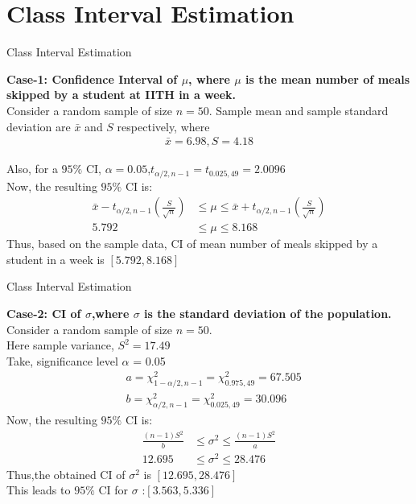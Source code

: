 \documentclass{beamer}
\begin{document}
\section{Class Interval Estimation}
\begin{frame}{Class Interval Estimation}
    \begin{block}{}
        \item \textbf{Case-1: Confidence Interval of $\mu$, where $\mu$ is the mean number of meals skipped by a student at IITH in a week. } \\
       Consider a random sample of size $n = 50$. 
       Sample mean and sample standard deviation are $\bar{x}$ and $S$ respectively, where
        \begin{align*}
            \bar{x}= 6.98, 
            S = 4.18 
        \end{align*}       
      
Also, for a $95\%$ CI, $\alpha=0.05$,$t_{\alpha/2,n-1} =t_{0.025,49}=2.0096$ \\
Now, the resulting $95\%$ CI is:
      \begin{align*}
        \bar{x}-t_{\alpha/2,n-1}\left(\frac{S}{\sqrt{n}}\right) &\leq \mu \leq \bar{x}+t_{\alpha/2,n-1}\left(\frac{S}{\sqrt{n}}\right)\\
        5.792 &\leq \mu \leq 8.168
      \end{align*}
      Thus, based on the sample data, CI of mean number of meals skipped by a student in a week is $[5.792,8.168]$ 
      \end{block}
\end{frame}
\begin{frame}{Class Interval Estimation}
    \begin{block}{}
        \item \textbf{Case-2: CI of $\sigma$,where $\sigma$ is the standard deviation of the population.} \\
       Consider a random sample of size $n = 50$.   \\
       Here sample variance,    $S^2 = 17.49$  \\
       Take, significance level $\alpha$ = 0.05                
        \begin{align*}
            &a = \chi^{2}_{1-\alpha/2,n-1} = \chi^{2}_{0.975,49} =67.505 \\
            &b = \chi^{2}_{\alpha/2,n-1} = \chi^{2}_{0.025,49} = 30.096
        \end{align*} 
        Now, the resulting $95\%$ CI is:
        \begin{align*}
            \frac{(n-1)S^2}{b} &\leq \sigma^2 \leq \frac{(n-1)S^2}{a}\\
            12.695 &\leq \sigma^2 \leq 28.476
          \end{align*}
          Thus,the obtained CI of $\sigma^2$ is $[12.695,28.476]$\\
          This leads to $95\%$ CI for $\sigma$ :$[3.563,5.336]$ 
           \end{block}
\end{frame}
\end{document}
